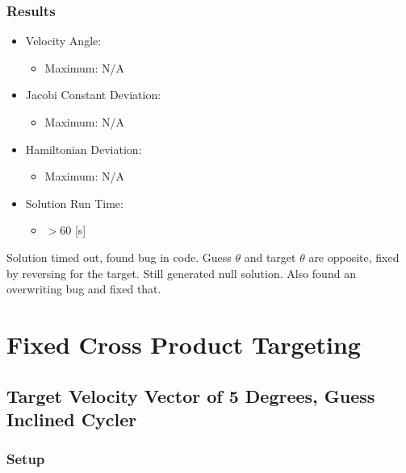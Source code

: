 \documentclass{article}
\begin{document}
\subsubsection{Results}

\begin{itemize}
    \item Velocity Angle:
    \begin{itemize}
        \item Maximum: N/A
    \end{itemize}
    \item Jacobi Constant Deviation:
    \begin{itemize}
        \item Maximum: N/A
    \end{itemize}
    \item Hamiltonian Deviation:
    \begin{itemize}
        \item Maximum: N/A
    \end{itemize}
    \item Solution Run Time:
    \begin{itemize}
        \item $>$60 [s]
    \end{itemize}  
\end{itemize}

Solution timed out, found bug in code. Guess $\theta$ and target $\theta$ are opposite, fixed by reversing for the target. Still generated null solution. Also found an overwriting bug and fixed that. 

\newpage

\section{Fixed Cross Product Targeting}

\subsection{Target Velocity Vector of 5 Degrees, Guess Inclined Cycler}

\subsubsection{Setup}
\end{document}
